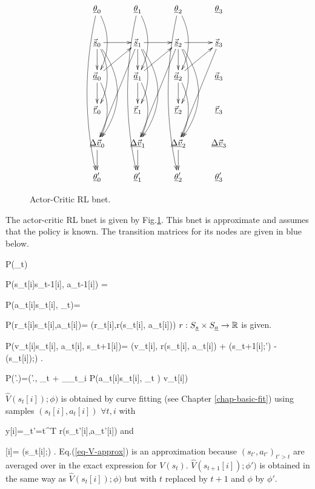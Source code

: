 \begin{figure}
\centering
$$\xymatrix{
\rvtheta_0\ar@/^1pc/[dd]\ar@/_1pc/[ddddd]&
\rvtheta_1\ar@/^1pc/[dd]\ar@/_1pc/[ddddd]&
\rvtheta_2\ar@/^1pc/[dd]\ar@/_1pc/[ddddd]&
\rvtheta_3\\
\vec{\rvs}_0\ar[r]\ar[d]\ar@/^1pc/[dd]
\ar@/^2pc/[ddd]&
\vec{\rvs}_1\ar[r]\ar[d]\ar@/^1pc/[dd]
\ar@/^2pc/[ddd]\ar[dddl]&
\vec{\rvs}_2\ar[r]\ar[d]\ar@/^1pc/[dd]
\ar@/^2pc/[ddd]\ar[dddl]&
\vec{\rvs}_3\ar[dddl]\\
\vec{\rva}_0\ar[d]\ar[ur]\ar@/^1pc/[dd]&
\vec{\rva}_1\ar[d]\ar[ur]\ar@/^1pc/[dd]&
\vec{\rva}_2\ar[d]\ar[ur]\ar@/^1pc/[dd]&
\vec{\rva}_3\\
\vec{\rvr}_0&
\vec{\rvr}_1&
\vec{\rvr}_2&
\vec{\rvr}_3\\
\ul{\Delta \vec{v}}_0\ar[d]&
\ul{\Delta \vec{v}}_1\ar[d]&
\ul{\Delta \vec{v}}_2\ar[d]&
\ul{\Delta \vec{v}}_3\\
\rvtheta'_0&
\rvtheta'_1&
\rvtheta'_2&
\rvtheta'_3
}$$
\caption{Actor-Critic RL bnet.  }
\label{fig-ac-rl}
\end{figure}
The actor-critic RL bnet
is given by Fig.\ref{fig-ac-rl}. This
bnet is approximate and assumes
that the policy is known. The
transition matrices for its nodes
are given in blue below.



\beq\color{blue}
P(\theta_t) 
\eeq

\beq\color{blue}
P(s_t[i]\cond s_{t-1}[i], a_{t-1}[i]) =  
\eeq

\beq\color{blue}
P(a_t[i]\cond s_t[i], \theta_t)= 
\eeq

\beq\color{blue}
P(r_t[i]\cond s_t[i],a_t[i])=
\delta(r_t[i],r(s_t[i], a_t[i]))
\eeq
$r:S_{\underline{s}}\times S_{\underline{a}}\rightarrow{ \mathbb{R}} $ is given.

\beq\color{blue}
P(\Delta v_t[i]\cond s_t[i], a_t[i], s_{t+1}[i])=
\delta(\Delta v_t[i], r(s_t[i], a_t[i]) +
\gamma {}(s_{t+1}[i];\phi')
- (s_t[i]);\phi)
\;.
\eeq

\beq\color{blue}
P(\theta'.)=\delta(\theta'.,
\theta_t +
\alpha \partial_{\theta_t}\sum_i
\log P(a_t[i]\cond s_t[i], \theta_t )
\Delta v_t[i])
\eeq

$\hat{V}(s_t[i]);\phi)$ is
obtained by curve fitting
 (see Chapter \ref{chap-basic-fit})
using samples $(s_t[i], a_t[i])$ 
$\forall t,i$
with

\beq
 y[i]=\sum_{t'=t}^{T}
r(s_{t'}[i],a_{t'}[i])
\label{eq-V-approx}
\eeq
and 

\beq
{}[i]=
(s_t[i];\phi)
\;.
\eeq
Eq.(\ref{eq-V-approx}) 
is an approximation
because $(s_{t'}, a_{t'})_{t'>t}$ 
are averaged over in the exact
expression for $V(s_t)$.
$\hat{V}(s_{t+1}[i]);\phi')$ is
obtained in the same way as
$\hat{V}(s_t[i]);\phi)$
but with $t$ replaced by $t+1$
and $\phi$ by $\phi'$.

